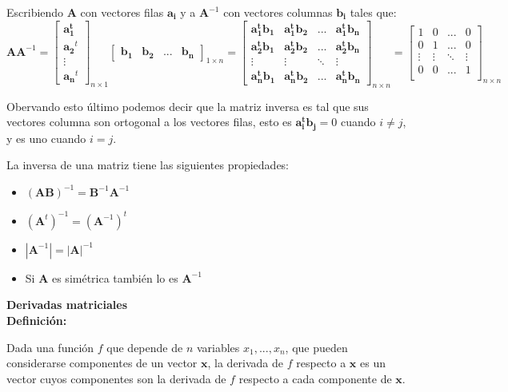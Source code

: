 \documentclass[12pt,letterpaper]{report} %
\begin{document}
Escribiendo $\mathbf{A}$ con vectores filas $\mathbf{a_{i}}$ y a $\mathbf{A}^{-1}$ con vectores columnas $\mathbf{b_{i}}$ tales que:
$$
\mathbf{A}\mathbf{A}^{-1}=\begin{bmatrix} \mathbf{a_{1}^t}\\ \mathbf{a_{2}}^t \\ \vdots \\ \mathbf{a_{n}}^t\end{bmatrix}_{n\times 1} \begin{bmatrix} \mathbf{b_{1}} & \mathbf{b_{2}} & ... & \mathbf{b_{n}} \end{bmatrix}_{1\times n}= \begin{bmatrix} \mathbf{a_{1}^tb_{1}} & \mathbf{a_{1}^tb_{2}} & ... & \mathbf{a_{1}^tb_{n}}\\  \mathbf{a_{2}^tb_{1}} & \mathbf{a_{2}^tb_{2}} & ... & \mathbf{a_{2}^tb_{n}} \\ \vdots & \vdots & \ddots & \vdots \\  \mathbf{a_{n}^tb_{1}} & \mathbf{a_{n}^tb_{2}} & ... & \mathbf{a_{n}^tb_{n}}  \end{bmatrix}_{n\times n}=
\begin{bmatrix}
1 & 0 & ... & 0 \\
0 & 1 & ... & 0 \\
\vdots   & \vdots &  \ddots & \vdots \\
0 & 0 & ... & 1 \\
\end{bmatrix}_{n\times n}
$$

Obervando esto último podemos decir que la matriz inversa es tal que sus vectores columna son ortogonal a los vectores filas, esto es $\mathbf{a_{i}^tb_{j}}=0$ cuando $i\ne j$, y es uno cuando $i=j$.

La inversa de una matriz tiene las siguientes propiedades:
\begin{itemize}
\item $(\mathbf{AB})^{-1}=\mathbf{B}^{-1}\mathbf{A}^{-1}$
\item $(\mathbf{A}^{t})^{-1}=(\mathbf{A}^{-1})^{t}$
\item $|\mathbf{A}^{-1}|=|\mathbf{A}|^{-1}$
\item Si $\mathbf{A}$ es simétrica también lo es $\mathbf{A}^{-1}$
\end{itemize}

\textbf{Derivadas matriciales} \\

\textbf{Definición:}

Dada una función $f$ que depende de $n$ variables $x_1,...,x_n$, que pueden considerarse componentes de un vector $\mathbf{x}$, la derivada de $f$ respecto a $\mathbf{x}$ es un vector cuyos componentes son la derivada de $f$ respecto a cada componente de $\mathbf{x}$.
\end{document}
